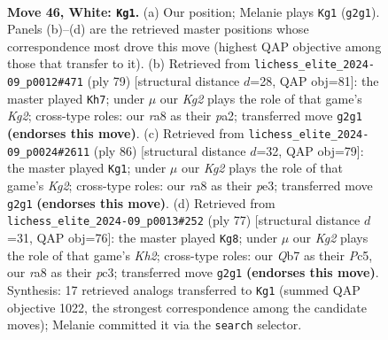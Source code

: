 \documentclass[11pt]{article}
\begin{document}
\clearpage

\begin{figure}[p]\centering
\begin{subfigure}{0.46\textwidth}\centering
\resizebox{\linewidth}{!}{%
\newchessgame
\chessboard[
  setfen={r7/1Q6/4kp2/3p4/5P2/p5P1/P2q2KP/8 w - - 11 46},
  showmover=false,
  pgfstyle=straightmove, color=movearrow, markmove={g2-g1}
]}
\caption{}
\end{subfigure}\hfill
\begin{subfigure}{0.46\textwidth}\centering
\resizebox{\linewidth}{!}{%
\newchessgame
\chessboard[
  setfen={8/p4pk1/6p1/1q6/3Qp2p/7P/P4PPK/8 b - - 1 40},
  showmover=false,
  pgfstyle=straightmove, color=movearrow, markmove={g7-h7}
]}
\caption{}
\end{subfigure}
\\[4pt]
\begin{subfigure}{0.46\textwidth}\centering
\resizebox{\linewidth}{!}{%
\newchessgame
\chessboard[
  setfen={6k1/p4p2/6pQ/3q4/8/1P2p1PP/5PK1/8 w - - 0 44},
  showmover=false,
  pgfstyle=straightmove, color=movearrow, markmove={g2-g1}
]}
\caption{}
\end{subfigure}\hfill
\begin{subfigure}{0.46\textwidth}\centering
\resizebox{\linewidth}{!}{%
\newchessgame
\chessboard[
  setfen={8/4Q2k/p1p3p1/2p4p/7P/2P3PK/Pq6/8 b - - 0 39},
  showmover=false,
  pgfstyle=straightmove, color=movearrow, markmove={h7-g8}
]}
\caption{}
\end{subfigure}
\caption{\textbf{Move 46, White: \texttt{Kg1}.} (a) Our position; Melanie plays \texttt{Kg1} (\texttt{g2g1}). Panels (b)--(d) are the retrieved master positions whose correspondence most drove this move (highest QAP objective among those that transfer to it). (b) Retrieved from \texttt{lichess\_elite\_2024-09\_p0012\#471} (ply 79) [structural distance $d$=28, QAP obj=81]: the master played \texttt{Kh7}; under $\mu$ our \emph{Kg2} plays the role of that game's \emph{Kg2}; cross-type roles: our \emph{r}a8 as their \emph{p}a2; transferred move \texttt{g2g1} \textbf{(endorses this move)}. (c) Retrieved from \texttt{lichess\_elite\_2024-09\_p0024\#2611} (ply 86) [structural distance $d$=32, QAP obj=79]: the master played \texttt{Kg1}; under $\mu$ our \emph{Kg2} plays the role of that game's \emph{Kg2}; cross-type roles: our \emph{r}a8 as their \emph{p}e3; transferred move \texttt{g2g1} \textbf{(endorses this move)}. (d) Retrieved from \texttt{lichess\_elite\_2024-09\_p0013\#252} (ply 77) [structural distance $d$=31, QAP obj=76]: the master played \texttt{Kg8}; under $\mu$ our \emph{Kg2} plays the role of that game's \emph{Kh2}; cross-type roles: our \emph{Q}b7 as their \emph{P}c5, our \emph{r}a8 as their \emph{p}c3; transferred move \texttt{g2g1} \textbf{(endorses this move)}. Synthesis: 17 retrieved analogs transferred to \texttt{Kg1} (summed QAP objective 1022, the strongest correspondence among the candidate moves); Melanie committed it via the \texttt{search} selector.}
\label{fig:thought-m90}
\end{figure}
\end{document}
